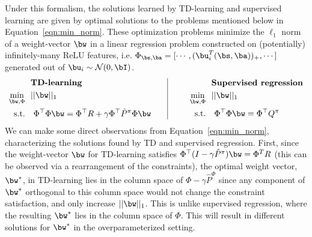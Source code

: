 Under this formalism, the solutions learned by TD-learning and supervised learning are given by optimal solutions to the problems mentioned below in Equation~\ref{eqn:min_norm}. These optimization problems minimize the $\ell_1$ norm of a weight-vector $\bw$ in a linear regression problem constructed on (potentially) infinitely-many ReLU features, i.e. $\Phi_{\bs, \ba} = [\cdots, (\bu_i^T (\bs, \ba))_{+}, \cdots]$ generated out of $\bu_i \sim \mathcal{N}(0, \bI)$.    
\begin{equation}
\begin{aligned}
    &\text{\textbf{TD-learning}} \\
    \min_{\bw, \Phi}~~& ||\bw||_1 \nonumber\\
    \text{s.t.}~~&~ {\Phi}^\top {\Phi} \bw = {\Phi}^\top R + \gamma {\Phi}^\top \hat{P}^\pi \Phi \bw
\end{aligned}
\;~~~~~ \vline\;
\begin{aligned}
    &\text{\textbf{Supervised regression}} \\
    ~~~~~~~\min_{\bw, \Phi}~~& ||\bw||_1 \nonumber\\
    \text{s.t.}~~&~ {\Phi}^\top {\Phi} \bw = {\Phi}^\top Q^\pi %
\end{aligned}
\label{eqn:min_norm}
\end{equation}
We can make some direct observations from Equation~\ref{eqn:min_norm},
characterizing the solutions found by TD and supervised regression. 
First, since the weight-vector $\bw$ for TD-learning satisfies $\Phi^\top (I - \gamma \hat{P}^\pi) \bw = \Phi^T R$ (this can be observed via a rearrangement of the constraints), the optimal weight vector, $\bw^*$, in TD-learning lies in the column space of $\Phi - \gamma \hat{P}^\Phi$ since any component of $\bw^*$ orthogonal to this column space would not change the constraint satisfaction, and only increase $||\bw||_1$. This is unlike supervised regression, where the resulting $\bw^*$ lies in the column space of $\Phi$. This will result in different solutions for $\bw^*$ in the overparameterized setting.


